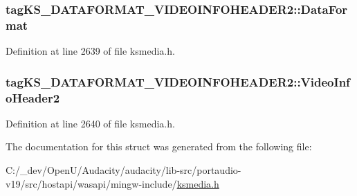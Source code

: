 \subsubsection[{\texorpdfstring{Data\+Format}{DataFormat}}]{ tag\+K\+S\+\_\+\+D\+A\+T\+A\+F\+O\+R\+M\+A\+T\+\_\+\+V\+I\+D\+E\+O\+I\+N\+F\+O\+H\+E\+A\+D\+E\+R2\+::\+Data\+Format}\hypertarget{structtag_k_s___d_a_t_a_f_o_r_m_a_t___v_i_d_e_o_i_n_f_o_h_e_a_d_e_r2_a2096132d988d02eb2f91882e28a4e3b4}{}\label{structtag_k_s___d_a_t_a_f_o_r_m_a_t___v_i_d_e_o_i_n_f_o_h_e_a_d_e_r2_a2096132d988d02eb2f91882e28a4e3b4}


Definition at line 2639 of file ksmedia.\+h.

\subsubsection[{\texorpdfstring{Video\+Info\+Header2}{VideoInfoHeader2}}]{ tag\+K\+S\+\_\+\+D\+A\+T\+A\+F\+O\+R\+M\+A\+T\+\_\+\+V\+I\+D\+E\+O\+I\+N\+F\+O\+H\+E\+A\+D\+E\+R2\+::\+Video\+Info\+Header2}\hypertarget{structtag_k_s___d_a_t_a_f_o_r_m_a_t___v_i_d_e_o_i_n_f_o_h_e_a_d_e_r2_adb24e45bbb6eaee2fff388ceaf8b67cc}{}\label{structtag_k_s___d_a_t_a_f_o_r_m_a_t___v_i_d_e_o_i_n_f_o_h_e_a_d_e_r2_adb24e45bbb6eaee2fff388ceaf8b67cc}


Definition at line 2640 of file ksmedia.\+h.



The documentation for this struct was generated from the following file\+:\begin{DoxyCompactItemize}
\item 
C\+:/\+\_\+dev/\+Open\+U/\+Audacity/audacity/lib-\/src/portaudio-\/v19/src/hostapi/wasapi/mingw-\/include/\hyperlink{ksmedia_8h}{ksmedia.\+h}\end{DoxyCompactItemize}
